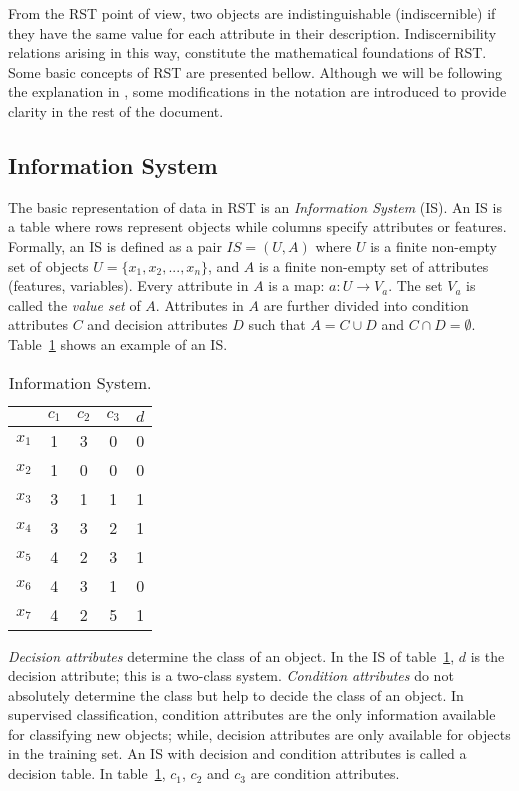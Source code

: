 \documentclass[citenumber]{llncs}
\begin{document}
  From the RST point of view, two objects are indistinguishable (indiscernible) if they have the same value for each attribute in their description. Indiscernibility relations arising in this way, constitute the mathematical foundations of RST. Some basic concepts of RST are presented bellow. Although we will be following the explanation in \cite{Polkowski00}, some modifications in the notation are introduced to provide clarity in the rest of the document.
  
\subsection{Information System}
  The basic representation of data in RST is an \emph{Information System} (IS). An IS is a table where rows represent objects while columns specify attributes or features. Formally, an IS is defined as a pair $IS=(U,A)$ where $U$ is a finite non-empty set of objects $U=\lbrace x_1,x_2,...,x_n\rbrace$, and $A$ is a finite non-empty set of attributes (features, variables). Every attribute in $A$ is a map: $a: U \rightarrow V_a$. The set $V_a$ is called the \textit{value set} of $A$. Attributes in $A$ are further divided into condition attributes $C$ and decision attributes $D$ such that $A=C \cup D$ and $C \cap D =\emptyset$.   Table~\ref{tab_IS} shows an example of an IS.
  
  
 \begin{table}[htb]
		\caption{Information System.} \label{tab_IS}
		\centering
 	\begin{tabular}{c||c|c|c||c}
 			  & $c_1$ & $c_2$ &  $c_3$ & $d$ \\
 		\hline \hline
		$x_1$ &   1   &    3  &  0  &   0   \\
		$x_2$ &   1   &    0  &  0  &   0   \\
		$x_3$ &   3   &    1  &  1  &   1   \\
		$x_4$ &   3   &    3  &  2  &   1   \\
		$x_5$ &   4   &    2  &  3  &   1   \\
		$x_6$ &   4   &    3  &  1  &   0   \\
		$x_7$ &   4   &    2  &  5  &   1   \\
 	\end{tabular}             
 \end{table}
 
   
  \textit{Decision attributes} determine the class of an object. In the IS of table~\ref{tab_IS}, $d$ is the decision attribute; this is a two-class system. \textit{Condition attributes} do not absolutely determine the class but help to decide the class of an object. In supervised classification, condition attributes are the only information available for classifying new objects; while, decision attributes are only available for objects in the training set. An IS with decision and condition attributes is called a decision table. In table~\ref{tab_IS}, $c_1$, $c_2$ and $c_3$ are condition attributes.
  
\end{document}
